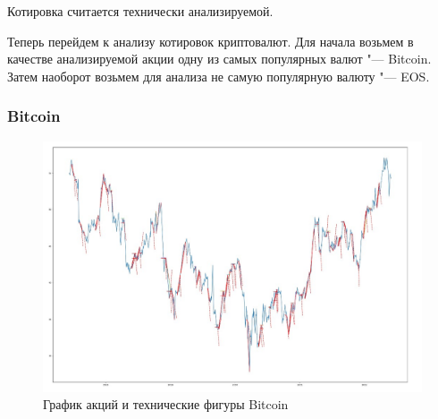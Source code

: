\documentclass[bachelor, och, coursework]{SCWorks}
\begin{document}
        Котировка считается технически анализируемой.

        Теперь перейдем к анализу котировок криптовалют. Для начала возьмем в
        качестве анализируемой акции одну из самых популярных валют "--- 
        Bitcoin. Затем наоборот возьмем для анализа не самую популярную валюту
        "--- EOS.

        \subsubsection{Bitcoin}
    
        \begin{figure}[H]
            \centering
            \includegraphics[width=\textwidth]{pic/BTC.jpg}
            \caption{График акций и технические фигуры Bitcoin}
        \end{figure}

        \pagebreak
        
\end{document}
